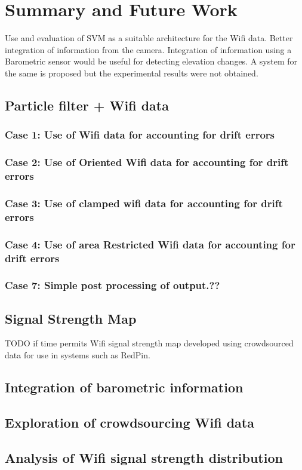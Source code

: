\chapter{Summary and Future Work\label{chap:summary}}
Use and evaluation of SVM as a suitable architecture for the Wifi data.
Better integration of information from the camera.
Integration of information using a Barometric sensor would be useful for detecting elevation changes. A system for the same is proposed but the experimental results were not obtained. 


\section{Particle filter + Wifi data}

\subsection{Case 1: Use of Wifi data for accounting for drift errors}
\subsection{Case 2: Use of Oriented Wifi data for accounting for drift errors}
\subsection{Case 3: Use of clamped wifi data for accounting for drift errors}
\subsection{Case 4: Use of area Restricted Wifi data for accounting for drift errors}
\subsection{Case 7: Simple post processing of output.??}

\section{Signal Strength Map}

TODO if time permits
Wifi signal strength map developed using crowdsourced data for use in systems such as RedPin.


\section{Integration of barometric information}

\section{Exploration of crowdsourcing Wifi data}

\section{Analysis of Wifi signal strength distribution}


